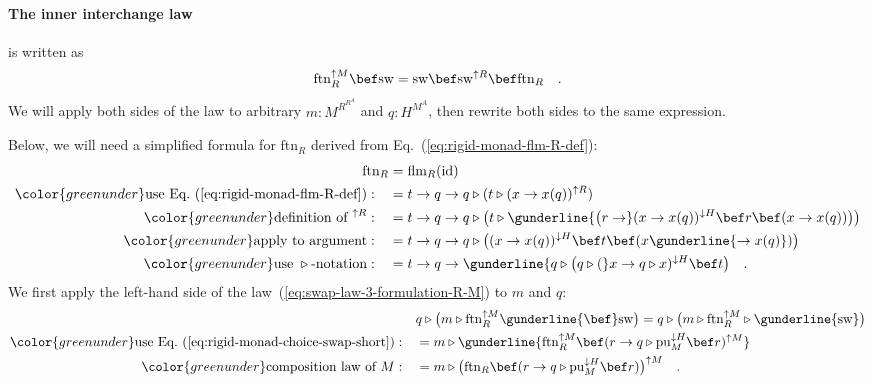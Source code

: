 \paragraph{The inner interchange law}

is written as
\begin{equation}
\text{ftn}_{R}^{\uparrow M}\bef\text{sw}=\text{sw}\bef\text{sw}^{\uparrow R}\bef\text{ftn}_{R}\quad.\label{eq:swap-law-3-formulation-R-M}
\end{equation}
We will apply both sides of the law to arbitrary $m:M^{R^{R^{A}}}$
and $q:H^{M^{A}}$, then rewrite both sides to the same expression. 

Below, we will need a simplified formula for $\text{ftn}_{R}$ derived
from Eq.~(\ref{eq:rigid-monad-flm-R-def}):
\begin{align}
\text{ftn}_{R} & =\text{flm}_{R}(\text{id})\nonumber \\
{\color{greenunder}\text{use Eq.~(\ref{eq:rigid-monad-flm-R-def})}:}\quad & =t\rightarrow q\rightarrow q\triangleright(t\triangleright(x\rightarrow x(q))^{\uparrow R})\nonumber \\
{\color{greenunder}\text{definition of }^{\uparrow R}:}\quad & =t\rightarrow q\rightarrow q\triangleright\big(t\triangleright\gunderline{\big(r\rightarrow}(x\rightarrow x(q))^{\downarrow H}\bef r\bef(x\rightarrow x(q))\big)\big)\nonumber \\
{\color{greenunder}\text{apply to argument}:}\quad & =t\rightarrow q\rightarrow q\triangleright\big((x\rightarrow x(q))^{\downarrow H}\bef t\bef(x\gunderline{\rightarrow x(q)})\big)\nonumber \\
{\color{greenunder}\text{use }\triangleright\text{-notation}:}\quad & =t\rightarrow q\rightarrow\gunderline{q\triangleright\big(q\triangleright(}x\rightarrow q\triangleright x)^{\downarrow H}\bef t\big)\quad.\label{eq:ftn-R-simplified}
\end{align}
We first apply the left-hand side of the law~(\ref{eq:swap-law-3-formulation-R-M})
to $m$ and $q$:
\begin{align*}
 & q\triangleright\big(m\triangleright\text{ftn}_{R}^{\uparrow M}\gunderline{\bef}\text{sw}\big)=q\triangleright\big(m\triangleright\text{ftn}_{R}^{\uparrow M}\triangleright\gunderline{\text{sw}}\big)\\
{\color{greenunder}\text{use Eq.~(\ref{eq:rigid-monad-choice-swap-short})}:}\quad & =m\triangleright\gunderline{\text{ftn}_{R}^{\uparrow M}\bef(r\rightarrow q\triangleright\text{pu}_{M}^{\downarrow H}\bef r)^{\uparrow M}}\\
{\color{greenunder}\text{composition law of }M:}\quad & =m\triangleright\big(\text{ftn}_{R}\bef(r\rightarrow q\triangleright\text{pu}_{M}^{\downarrow H}\bef r)\big)^{\uparrow M}\quad.
\end{align*}

